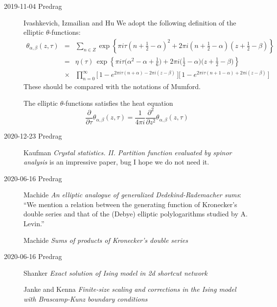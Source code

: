 \begin{description}
\item[2019-11-04 Predrag]
Ivashkevich, Izmailian and Hu
We adopt the following definition of the elliptic
$\theta$-functions:
\begin{eqnarray}
\theta_{\alpha,\beta}(z,\tau)&=&\sum_{n\in Z} \exp\left\{ \pi
i\tau \left(n+\textstyle{\frac{1}{2}}-\alpha\right)^2+2\pi i
\left(n+\textstyle{\frac{1}{2}}-\alpha\right)\left(z+\textstyle{\frac{1}{2}}-\beta\right)
\right\}~~~~\nonumber\\ &=&\eta(\tau)\,\exp\left\{\textstyle{\pi
i\tau\big(\alpha^2-\alpha+\frac{1}{6}\big)+2\pi
i\big(\frac{1}{2}-\alpha\big)\big(z+\frac{1}{2}-\beta\big)}\right\}\nonumber\\
&\times&\prod_{n=0}^{\infty}\!\Big[\,1-e^{2\pi
i\tau\left(n+\alpha\right)-2\pi i\left(z-\beta\right)}\,\Big]
\Big[\,1-e^{2\pi i\tau\left(n+1-\alpha\right)+2\pi
i\left(z-\beta\right)}\,\Big]\nonumber
\end{eqnarray}
These should be compared with the notations of Mumford. %

The elliptic $\theta$-functions satisfies the heat equation
\begin{equation}
\frac{\partial}{\partial \tau}\theta_{\alpha,\beta}(z,\tau) =
\frac{1}{4\pi i}\frac{\partial^2}{\partial z^2}\theta_{\alpha,\beta}(z,\tau)
\label{heat}
\end{equation}

\item[2020-12-23 Predrag]
Kaufman {\em Crystal statistics. {II}. {Partition} function
evaluated by spinor analysis} is an impressive paper, bug I hope we do
not need it.

\item[2020-06-16 Predrag]
Machide {\em An elliptic analogue of generalized
{Dedekind-Rademacher} sums}: ``We mention a relation between the
generating function of Kronecker's double series and that of
the (Debye) elliptic polylogarithms studied by A. Levin.''

Machide
{\em Sums of products of {Kronecker}'s double series}

\item[2020-06-16 Predrag]
Shanker
{\em Exact solution of {Ising} model in 2d shortcut network}

Janke and Kenna {\em Finite-size scaling and corrections in
the {Ising} model with {Brascamp-Kunz} boundary conditions}


\end{description}

